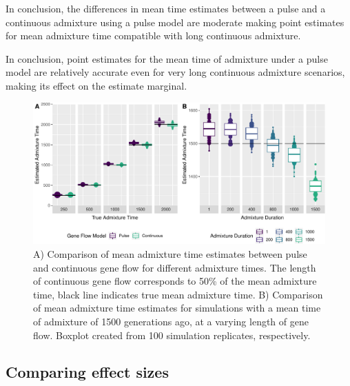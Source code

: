 \documentclass[]{article}
\begin{document}
In conclusion, the differences in mean time estimates between a pulse and a continuous admixture using a pulse model are moderate making point estimates for mean admixture time compatible with long continuous admixture.

In conclusion, point estimates for the mean time of admixture under a pulse model are relatively accurate even for very long continuous admixture scenarios, making its effect on the estimate marginal.

\begin{figure}
\centering
\includegraphics{Admixture_Time_Inference_Paper_Draft_files/figure-latex/fig2-1.pdf}
\caption{\label{fig:fig2} A) Comparison of mean admixture time estimates
between pulse and continuous gene flow for different admixture times.
The length of continuous gene flow corresponds to 50\% of the mean
admixture time, black line indicates true mean admixture time. B)
Comparison of mean admixture time estimates for simulations with a mean
time of admixture of 1500 generations ago, at a varying length of gene
flow. Boxplot created from 100 simulation replicates, respectively.}
\end{figure}

\subsection{Comparing effect sizes}\label{comparing effect sizes}
\end{document}
